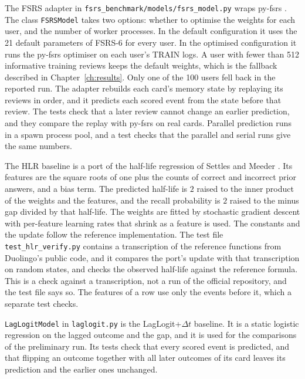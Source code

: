 The FSRS adapter in \texttt{fsrs\_benchmark/\allowbreak models/fsrs\_model.py} wraps py-fsrs \cite{pyfsrs}. The class
\texttt{FSRSModel} takes two options: whether to optimise the weights for each user, and the number of
worker processes. In the default configuration it uses the 21 default parameters of FSRS-6 for every
user. In the optimised configuration it runs the py-fsrs optimiser on each user's TRAIN logs. A user
with fewer than 512 informative training reviews keeps the default weights, which is the fallback
described in Chapter~\ref{ch:results}. Only one of the 100 users fell back in the reported run. The
adapter rebuilds each card's memory state by replaying its reviews in order, and it predicts each scored
event from the state before that review. The tests check that a later review cannot change an earlier
prediction, and they compare the replay with py-fsrs on real cards. Parallel prediction runs in a spawn
process pool, and a test checks that the parallel and serial runs give the same numbers.

The HLR baseline is a port of the half-life regression of Settles and Meeder \cite{settles2016trainable}.
Its features are the square roots of one plus the counts of correct and incorrect prior answers, and a
bias term. The predicted half-life is $2$ raised to the inner product of the weights and the features, and
the recall probability is $2$ raised to the minus gap divided by that half-life. The weights are fitted by
stochastic gradient descent with per-feature learning rates that shrink as a feature is used. The
constants and the update follow the reference implementation. The test file \texttt{test\_hlr\_verify.py}
contains a transcription of the reference functions from Duolingo's public code, and it compares the port's update with that transcription on random states, and checks the observed half-life against the reference formula. This is a check against a
transcription, not a run of the official repository, and the test file says so. The features of a row use
only the events before it, which a separate test checks.

\texttt{LagLogitModel} in \texttt{laglogit.py} is the LagLogit+$\Delta t$ baseline. It is a static logistic
regression on the lagged outcome and the gap, and it is used for the comparisons of the preliminary run.
Its tests check that every scored event is predicted, and that flipping an outcome together with all later outcomes of its card leaves its prediction and the earlier ones unchanged.

